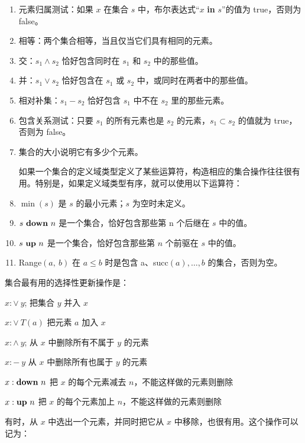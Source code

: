 \begin{enumerate}[wide, nosep, label=(\arabic*)]
	\item 元素归属测试：如果 $x$ 在集合 $s$ 中，布尔表达式“$x$ \textbf{in} $s$”的值为 true，否则为 false。
	\item 相等：两个集合相等，当且仅当它们具有相同的元素。
	\item 交：$s_1 \wedge s_2$ 恰好包含同时在 $s_1$ 和 $s_2$ 中的那些值。
	\item 并：$s_1 \vee s_2$ 恰好包含在 $s_1$ 或 $s_2$ 中，或同时在两者中的那些值。
	\item 相对补集：$s_1 - s_2$ 恰好包含 $s_1$ 中不在 $s_2$ 里的那些元素。
	\item 包含关系测试：只要 $s_1$ 的所有元素也是 $s_2$ 的元素，$s_1 \subset s_2$ 的值就为 true，否则为 false。
	\item 集合的大小说明它有多少个元素。

	如果一个集合的定义域类型定义了某些运算符，构造相应的集合操作往往很有用。特别是，如果定义域类型有序，就可以使用以下运算符：

	\item $\min(s)$ 是 $s$ 的最小元素；$s$ 为空时未定义。
	\item $s \text{ \textbf{down} } n$ 是一个集合，恰好包含那些第 n 个后继在 $s$ 中的值。
	\item $s \text{ \textbf{up} } n$ 是一个集合，恰好包含那些第 $n$ 个前驱在 $s$ 中的值。
	\item Range$(a,\ b)$ 在 $a \leqslant b$ 时是包含 a、succ$(a), \dots, b$ 的集合，否则为空。
\end{enumerate}

集合最有用的选择性更新操作是：

\noindent
$x:\vee\ y$; \tabto*{5em} 把集合 $y$ 并入 $x$

\noindent
$x:\vee\ T(a)$ \tabto*{5em} 把元素 $a$ 加入 $x$

\noindent
$x:\wedge\ y$; \tabto*{5em} 从 $x$ 中删除所有不属于 $y$ 的元素

\noindent
$x:-\ y$ \tabto*{5em} 从 $x$ 中删除所有也属于 $y$ 的元素

\noindent
{}\parindent$x:\text{\textbf{down} }n$ \tabto*{5em} 把 $x$ 的每个元素减去 $n$，不能这样做的元素则删除

\noindent
{}\parindent$x:\text{\textbf{up} } n$ \tabto*{5em} 把 $x$ 的每个元素加上 $n$，不能这样做的元素则删除

\noindent
有时，从 $x$ 中选出一个元素，并同时把它从 $x$ 中移除，也很有用。这个操作可以记为：

